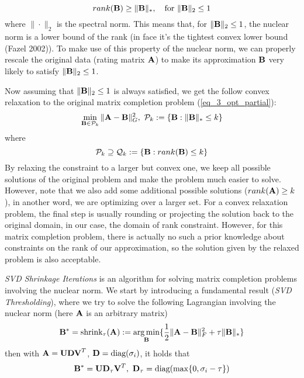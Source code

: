 \documentclass[../book-template.tex]{subfiles}
\begin{document}
\begin{equation*}
	rank({\bf B})\geq \|{\bf B}\|_*,\quad \text{for }\|{\bf B}\|_2\leq 1
\end{equation*}
where $\|\cdot\|_2$ is the spectral norm. This means that, for $\|{\bf B}\|_2\leq 1$, the nuclear norm is a lower bound of the rank (in face it's the tightest convex lower bound (Fazel 2002)). To make use of this property of the nuclear norm, we can properly rescale the original data (rating matrix ${\bf A}$) to make its approximation ${\bf B}$ very likely to satisfy $\|{\bf B}\|_2\leq 1$.
\par Now assuming that $\|{\bf B}\|_2\leq 1$ is always satisfied, we get the follow convex relaxation to the original matrix completion problem (\ref{eq_3_opt_partial}):
\begin{equation*}
	\min_{{\bf B}\in \mathcal{P}_k}\|{\bf A}-{\bf B}\|^2_G,\ \mathcal{P}_k:=\{{\bf B}:\|{\bf B}\|_*\leq k\}
\end{equation*}
where
\begin{equation*}
	\mathcal{P}_k\supseteq \mathcal{Q}_k:=\{{\bf B}:rank({\bf B})\leq k\}
\end{equation*}
By relaxing the constraint to a larger but convex one, we keep all possible solutions of the original problem and make the problem much easier to solve. However, note that we also add some additional possible solutions ($rank({\bf A})\geq k$), in another word, we are optimizing over a larger set. For a convex relaxation problem, the final step is usually rounding or projecting the solution back to the original domain, in our case, the domain of rank constraint. However, for this matrix completion problem, there is actually no such a prior knowledge about constraints on the rank of our approximation, so the solution given by the relaxed problem is also acceptable.
\par \emph{SVD Shrinkage Iterations} is an algorithm for solving matrix completion problems involving the nuclear norm. We start by introducing a fundamental result (\emph{SVD Thresholding}), where we try to solve the following Lagrangian involving the nuclear norm (here ${\bf A}$ is an arbitrary matrix)
\begin{equation}\label{eq_3_svdthres}
	{\bf B}^*=\text{shrink}_{\tau}({\bf A}):=\mathop{\arg\min}_{{\bf B}}\{\frac{1}{2}\|{\bf A}-{\bf B}\|^2_F+\tau\|{\bf B}\|_*\}
\end{equation}
then with ${\bf A}={\bf UDV}^T$, ${\bf D}=\text{diag}(\sigma_i)$, it holds that
\begin{equation*}
	{\bf B}^* = {\bf UD}_{\tau}{\bf V}^T,\ {\bf D}_{\tau}=\text{diag}(\max\{0, \sigma_i-\tau\})
\end{equation*}
\end{document}
